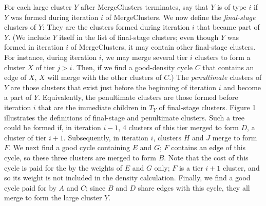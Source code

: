 \documentclass[11pt]{article}
\begin{document}
For each large cluster $Y$ after {\sc MergeClusters} terminates, say
that $Y$ is of type $i$ if $Y$ was formed during iteration $i$ of
MergeClusters. We now define the \emph{final-stage} clusters of $Y$:
They are the clusters formed during iteration $i$ that became part of
$Y$. (We include $Y$ itself in the list of final-stage clusters; even
though $Y$ was formed in iteration $i$ of {\sc MergeClusters}, it may
contain other final-stage clusters. For instance, during iteration
$i$, we may merge several tier $i$ clusters to form a cluster $X$ of
tier $j > i$. Then, if we find a good-density cycle $C$ that contains
an edge of $X$, $X$ will merge with the other clusters of $C$.)  The
\emph{penultimate} clusters of $Y$ are those clusters that exist just
before the beginning of iteration $i$ and become a part of
$Y$. Equivalently, the penultimate clusters are those formed before
iteration $i$ that are the immediate children in $T_Y$ of final-stage
clusters. Figure 1 illustrates the definitions of final-stage and
penultimate clusters. Such a tree could be formed if, in iteration
$i-1$, 4 clusters of this tier merged to form $D$, a cluster of tier
$i+1$. Subsequently, in iteration $i$, clusters $H$ and $J$ merge to
form $F$. We next find a good cycle containing $E$ and $G$; $F$
contains an edge of this cycle, so these three clusters are merged to
form $B$. Note that the cost of this cycle is paid for the by the
weights of $E$ and $G$ only; $F$ is a tier $i+1$ cluster, and so its
weight is not included in the density calculation. Finally, we find a
good cycle paid for by $A$ and $C$; since $B$ and $D$ share edges with
this cycle, they all merge to form the large cluster $Y$.
\end{document}
